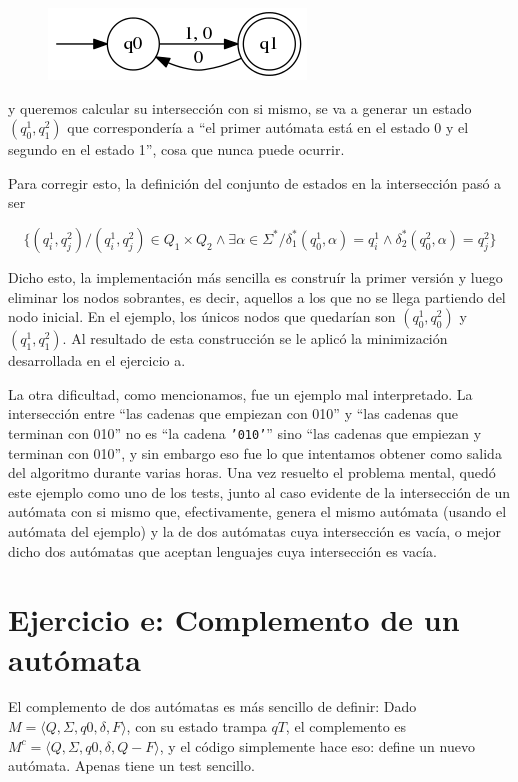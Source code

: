\documentclass{article}
\begin{document}
\begin{figure}[h!]
  \centering
    \includegraphics[scale=0.5]{ejd}
\end{figure}

\noindent 
y queremos calcular su intersección con si mismo, se va a generar un estado $(q^1_0, q^2_1)$ que correspondería a ``el primer autómata está en el estado 0 y el segundo en el estado 1'', cosa que nunca puede ocurrir.

Para corregir esto, la definición del conjunto de estados en la intersección pasó a ser

$$
\{(q^1_i, q^2_j) / (q^1_i, q^2_j) \in Q_1 \times Q_2 \wedge \exists \alpha \in \Sigma^* / \delta_1^*(q^1_0, \alpha) = q^1_i \wedge  \delta_2^*(q^2_0, \alpha) = q^2_j \}
$$

Dicho esto, la implementación más sencilla es construír la primer versión y luego eliminar los nodos sobrantes, es decir, aquellos a los que no se llega partiendo del nodo inicial.  En el ejemplo, los únicos nodos que quedarían son $(q^1_0, q^2_0)$ y $(q^1_1, q^2_1)$.  Al resultado de esta construcción se le aplicó la minimización desarrollada en el ejercicio a.

La otra dificultad, como mencionamos, fue un ejemplo mal interpretado.  La intersección entre ``las cadenas que empiezan con 010'' y ``las cadenas que terminan con 010'' no es ``la cadena \texttt{'010'}'' sino ``las cadenas que empiezan y terminan con 010'', y sin embargo eso fue lo que intentamos obtener como salida del algoritmo durante varias horas.  Una vez resuelto el problema mental, quedó este ejemplo como uno de los tests, junto al caso evidente de la intersección de un autómata con si mismo que, efectivamente, genera el mismo autómata (usando el autómata del ejemplo) y la de dos autómatas cuya intersección es vacía, o mejor dicho dos autómatas que aceptan lenguajes cuya intersección es vacía.

\section*{Ejercicio e: Complemento de un autómata}
El complemento de dos autómatas es más sencillo de definir: Dado $M = \langle Q, \Sigma, q0, \delta, F \rangle$, con su estado trampa $qT$, el complemento es $M^c = \langle Q, \Sigma, q0, \delta, Q - F \rangle$, y el código simplemente hace eso: define un nuevo autómata.  Apenas tiene un test sencillo.
\end{document}
